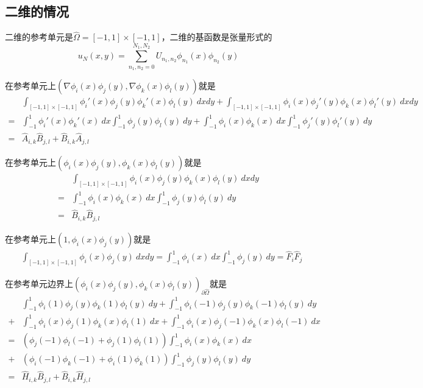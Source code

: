 \documentclass[UTF8,12pt]{article}
\begin{document}
\subsection{二维的情况}

二维的参考单元是$\hat{\Omega} = [-1,1] \times [-1,1]$，二维的基函数是张量形式的
$$ u_N(x,y) = \sum_{n_1,n_2 = 0}^{N_1, N_2} U_{n_1,n_2} \phi_{n_1}(x) \phi_{n_2}(y) $$

在参考单元上$(\nabla \phi_i(x) \phi_j(y), \nabla \phi_k(x) \phi_l(y))$就是
\begin{align*}
& \int_{[-1,1] \times [-1,1]} \phi_i'(x) \phi_j(y) \phi_k'(x) \phi_l(y) \ dx dy + \int_{[-1,1] \times [-1,1]} \phi_i(x) \phi_j'(y) \phi_k(x) \phi_l'(y) \ dx dy \\
= & \int_{-1}^{1} \phi_i'(x) \phi_k'(x) \ dx \int_{-1}^{1} \phi_j(y) \phi_l(y) \ dy + \int_{-1}^{1} \phi_i(x) \phi_k(x) \ dx \int_{-1}^{1} \phi_j'(y) \phi_l'(y) \ dy \\
= & \hat{A}_{i,k} \hat{B}_{j,l} + \hat{B}_{i,k} \hat{A}_{j,l}
\end{align*}

在参考单元上$(\phi_i(x) \phi_j(y), \phi_k(x) \phi_l(y))$就是
\begin{align*}
& \int_{[-1,1] \times [-1,1]} \phi_i(x) \phi_j(y) \phi_k(x) \phi_l(y) \ dx dy \\
= & \int_{-1}^{1} \phi_i(x) \phi_k(x) \ dx \int_{-1}^{1} \phi_j(y) \phi_l(y) \ dy \\
= & \hat{B}_{i,k} \hat{B}_{j,l}
\end{align*}

在参考单元上$(1, \phi_i(x) \phi_j(y))$就是
\begin{align*}
& \int_{[-1,1] \times [-1,1]} \phi_i(x) \phi_j(y) \ dx dy = \int_{-1}^{1} \phi_i(x) \ dx \int_{-1}^{1} \phi_j(y) \ dy = \hat{F}_{i} \hat{F}_{j}
\end{align*}

在参考单元边界上$(\phi_i(x) \phi_j(y), \phi_k(x) \phi_l(y))_{\partial \hat{\Omega}}$就是
\begin{align*}
& \int_{-1}^{1} \phi_i(1) \phi_j(y) \phi_k(1) \phi_l(y) \ dy + \int_{-1}^{1} \phi_i(-1) \phi_j(y) \phi_k(-1) \phi_l(y) \ dy \\
+ & \int_{-1}^{1} \phi_i(x) \phi_j(1) \phi_k(x) \phi_l(1) \ dx + \int_{-1}^{1} \phi_i(x) \phi_j(-1) \phi_k(x) \phi_l(-1) \ dx \\
= & (\phi_j(-1) \phi_l(-1) + \phi_j(1) \phi_l(1)) \int_{-1}^{1} \phi_i(x) \phi_k(x) \ dx \\
+ & (\phi_i(-1) \phi_k(-1) + \phi_i(1) \phi_k(1)) \int_{-1}^{1} \phi_j(y) \phi_l(y) \ dy \\
= & \hat{H}_{i,k} \hat{B}_{j,l} + \hat{B}_{i,k} \hat{H}_{j,l}
\end{align*}
\end{document}

